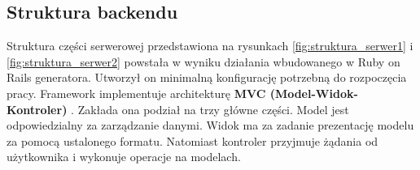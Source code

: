 \documentclass[declaration,shortabstract,polish,inz]{iithesis}
\begin{document}
\subsection{Struktura backendu}
Struktura części serwerowej przedstawiona na rysunkach \ref{fig:struktura_serwer1} i \ref{fig:struktura_serwer2} powstała w wyniku działania wbudowanego w Ruby on Rails generatora. Utworzył on minimalną konfigurację potrzebną do rozpoczęcia pracy. Framework implementuje architekturę \textbf{MVC (Model-Widok-Kontroler)} \cite{rortutorial}. Zakłada ona podział na trzy główne części. Model jest odpowiedzialny za zarządzanie danymi. Widok ma za zadanie prezentację modelu za pomocą ustalonego formatu. Natomiast kontroler przyjmuje żądania od użytkownika i wykonuje operacje na modelach. 

\newpage
\end{document}
